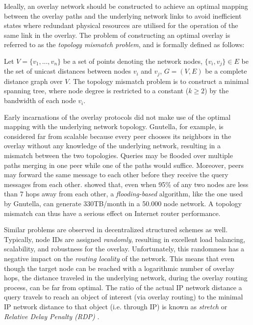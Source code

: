 Ideally, an overlay network should be constructed to achieve an optimal 
mapping between the overlay paths and the underlying network links to avoid
inefficient states where redundant physical resources are utilised for the
operation of the same link in the overlay. The problem of constructing an optimal
overlay is referred to as the \emph{topology mismatch problem}, and is formally
defined as follows:
\begin{definition}
Let $V = \{v_1, ..., v_n\}$ be a set of points denoting the network nodes,
$\{v_i, v_j\} \in E$ be the set of unicast distances between nodes $v_i$ and
$v_j$, $G=(V,E)$ be a complete distance graph over $V$. The topology mismatch
problem is to construct a minimal spanning tree, where node degree is
restricted to a constant ($k\geq 2$) by the bandwidth of each node $v_i$.
\end{definition}

Early incarnations of the overlay protocols did not make use of the optimal
mapping with the underlying network topology. Gnutella, for example, is
considered far from scalable \cite{ritter_gnucantscale_2001} because every peer
chooses its neighbors in the overlay without any knowledge of the underlying
network, resulting in a mismatch between the two topologies. Queries may be
flooded over multiple paths merging in one peer while one of the paths would
suffice.  Moreover, peers may forward the same message to each other
before they receive the query messages from each other.
\cite{matei_mapgnutella_2002} showed that, even when 95\% of any two nodes are
less than 7 hops away from each other, a \emph{flooding-based} algorithm, like
the one used by Gnutella, can generate 330TB/month in a 50.000 node network. A
topology mismatch can thus have a serious effect on Internet router performance.

Similar problems are observed in decentralized structured schemes as well.
Typically, node IDs are assigned \emph{randomly}, resulting in excellent load
balancing, scalability, and robustness for the overlay. Unfortunately, this
randomness has a negative impact on the \emph{routing locality} of the network.
This means that even though the target node can be reached with a logarithmic
number of overlay hops, the distance traveled in the underlying network, during the
overlay routing process, can be far from optimal.  The ratio of the actual IP
network distance a query travels to reach an object of interest (via overlay
routing) to the minimal IP network distance to that object (i.e. through IP) is
known as \emph{stretch} or \emph{Relative Delay Penalty (RDP)} \cite{CRZ2000}.

